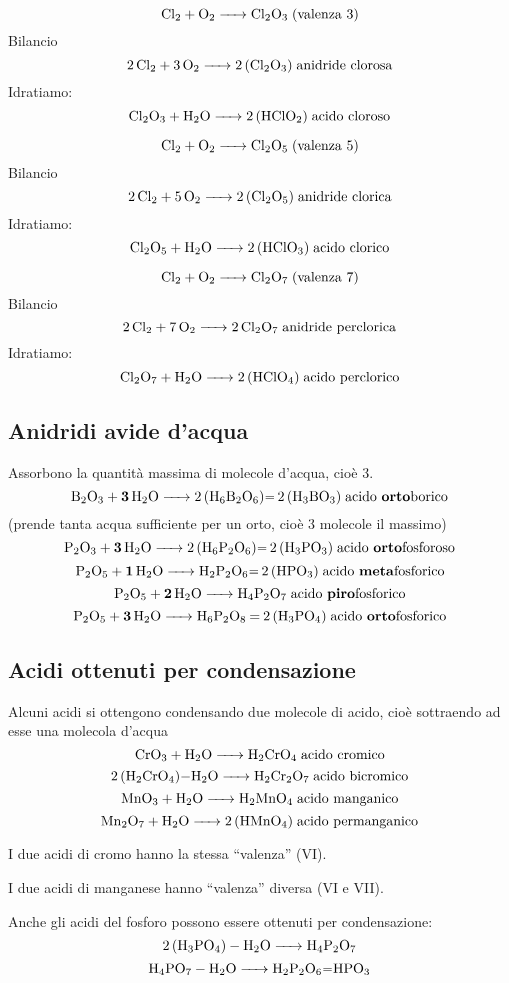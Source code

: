 $$\ce{Cl_2 + O_2 -> Cl_2O_3} \; \text{(valenza 3)}$$ Bilancio
$$\ce{2 Cl_2 + 3 O_2 -> 2 (Cl_2O_3)} \; \text{anidride clorosa}$$
Idratiamo:
$$\ce{Cl_2O_3 + H_2O -> 2 (HClO_2) } \; \text{acido cloroso}$$

$$\ce{Cl_2 + O_2 -> Cl_2O_5} \; \text{(valenza 5)}$$ Bilancio
$$\ce{2 Cl_2 + 5 O_2 -> 2 (Cl_2O_5)} \; \text{anidride clorica}$$
Idratiamo:
$$\ce{Cl_2O_5 + H_2O -> 2 (HClO_3)} \; \text{acido clorico}$$

$$\ce{Cl_2 + O_2 -> Cl_2O_7} \; \text{(valenza 7)}$$ Bilancio
$$\ce{2 Cl_2 + 7 O_2 -> 2 Cl_2O_7} \; \text{anidride perclorica}$$
Idratiamo:
$$\ce{Cl_2O_7 + H_2O -> 2 (HClO_4)} \; \text{acido perclorico}$$

\subsection{Anidridi avide d'acqua}
Assorbono la quantità massima di molecole d'acqua, cioè 3.
$$\ce{B_2O_3 + \textbf{3} H_2O -> 2 (H_6B_2O_6)= 2 (H_3BO_3)} \; \text{acido \textbf{orto}borico}$$\hspace{+1.2cm}(prende tanta acqua sufficiente per un orto, cioè 3 molecole il massimo)
$$\ce{P_2O_3 + \textbf{3} H_2O -> 2 (H_6P_2O_6)= 2 (H_3PO_3)} \; \text{acido \textbf{orto}fosforoso}$$
$$\ce{P_2O_5 + \textbf{1} H_2O -> H_2P_2O_6= 2 (HPO_3)} \; \text{acido \textbf{meta}fosforico}$$
$$\ce{P_2O_5 + \textbf{2} H_2O -> H_4P_2O_7} \; \text{acido \textbf{piro}fosforico}$$
$$\ce{P_2O_5 + \textbf{3} H_2O -> H_6P_2O_8 = 2 (H_3PO_4)} \; \text{acido \textbf{orto}fosforico}$$
\subsection{Acidi ottenuti per condensazione}
Alcuni acidi si ottengono condensando due molecole di acido, cioè sottraendo ad esse una molecola d'acqua
$$\ce{CrO_3 + H_2O -> H_2CrO_4} \; \text{acido cromico}$$
$$\ce{2 (H_2CrO_4)-H_2O -> H_2Cr_2O_7} \; \text{acido bicromico}$$
$$\ce{MnO_3 + H_2O -> H_2MnO_4} \; \text{acido manganico}$$
$$\ce{Mn_2O_7 + H_2O -> 2 (HMnO_4)} \; \text{acido permanganico}$$

I due acidi di cromo hanno la stessa “valenza” (VI).

I due acidi di manganese hanno “valenza” diversa (VI e VII).

Anche gli acidi del fosforo possono essere ottenuti per condensazione:
$$\ce{2 (H_3PO_4) - H_2O -> H_4P_2O_7}$$
$$\ce{H_4PO_7 - H_2O -> H_2P_2O_6=HPO_3}$$
